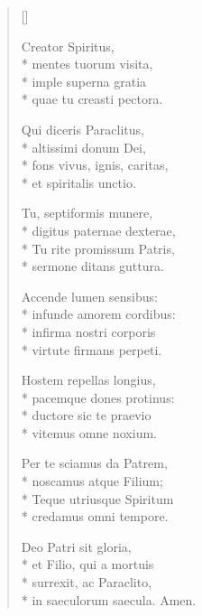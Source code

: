 \newHymn
{}

\begin{verse}[\versewidth]

 Creator Spiritus,\\*
 mentes tuorum visita,        \\*
 imple superna gratia         \\*
 quae tu creasti pectora.     

 Qui diceris Paraclitus,\\*
 altissimi donum Dei,     \\*    
 fons vivus, ignis, caritas,\\*  
 et spiritalis unctio.        

 Tu, septiformis munere,\\*
 digitus paternae dexterae,\\*
 Tu rite promissum Patris,   \\* 
 sermone ditans guttura.      

 Accende lumen sensibus:\\*
 infunde amorem cordibus: \\*    
 infirma nostri corporis    \\*  
 virtute firmans perpeti.     

 Hostem repellas longius,\\*
 pacemque dones protinus:  \\*   
 ductore sic te praevio      \\* 
 vitemus omne noxium.         

 Per te sciamus da Patrem,\\*
 noscamus atque Filium;     \\*  
 Teque utriusque Spiritum     \\*
 credamus omni tempore.       

 Deo Patri sit gloria,\\*
 et Filio, qui a mortuis\\*      
 surrexit, ac Paraclito,  \\*    
 in saeculorum saecula.       
 Amen.                        

\end{verse}


